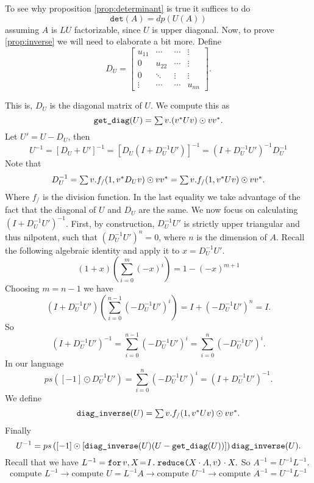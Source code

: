 To see why proposition \ref{prop:determinant} is true it suffices to do $$\texttt{det}(A)=dp(U(A))$$ assuming $A$ is $LU$ factorizable, since $U$ is upper diagonal.
Now, to prove \ref{prop:inverse} we will need to elaborate a bit more. Define 
\[
D_U = \begin{bmatrix}
    u_{11} & \cdots & \cdots &  \vdots \\
    0 & u_{22} & \cdots &  \vdots \\
    0 & \ddots & \vdots & \vdots \\
    \vdots & \cdots& \cdots & u_{nn}
\end{bmatrix}.
\]

This is, $D_U$ is the diagonal matrix of $U$. We compute this as $$ \getdiag{U} = \ssum v. (v^*Uv) \odot vv^*.$$
Let $U'=U-D_U$, then $$ U^{-1}=\left[ D_U+U' \right]^{-1}= \left[ D_U\left( I+D_U^{-1}U'\right) \right]^{-1} = \left( I+D_U^{-1}U'\right)^{-1}D_U^{-1} $$
Note that $$D_U^{-1}=\ssum v. f_{/}(1,v^*D_Uv)\odot vv^*=\ssum v. f_{/}(1,v^*Uv)\odot vv^*.$$
Where $f_{/}$ is the division function. In the last equality we take advantage of the fact that the diagonal of $U$ and $D_U$ are the same.
We now focus on calculating $\left( I+D_U^{-1}U'\right)^{-1}$. First, by construction, $D_U^{-1}U'$ is strictly upper triangular and thus nilpotent, such that $\left( D_U^{-1}U'\right)^n=0$, where $n$ is the dimension of $A$. Recall the following algebraic identity and apply it to $x=D_U^{-1}U'$. $$(1+x)\left( \sum_{i=0}^{m}(-x)^i \right)=1-(-x)^{m+1}$$
Choosing $m=n-1$ we have $$\left(I+D_U^{-1}U' \right)\left( \sum_{i=0}^{n-1}(-D_U^{-1}U')^i \right)=I+ \left( -D_U^{-1}U'\right)^n =I. $$
So $$\left(I+D_U^{-1}U' \right)^{-1}=\sum_{i=0}^{n-1}(-D_U^{-1}U')^i=\sum_{i=0}^{n}(-D_U^{-1}U')^i.$$
In our language $$ps([-1]\odot D_U^{-1}U')=\sum_{i=0}^{n}(-D_U^{-1}U')^i=\left(I+D_U^{-1}U' \right)^{-1}.$$
We define $$\diaginverse{U}=\ssum v. f_{/}(1,v^*Uv)\odot vv^*.$$
Finally $$U^{-1}= ps\left([-1]\odot \left[\diaginverse{U}(U-\getdiag{U})\right] \right)\diaginverse{U}.$$
Recall that we have $L^{-1}=\initf{I}{v}{X}{\red{X\cdot A}{v}\cdot X}.$ So $A^{-1}=U^{-1}L^{-1}.$
$$\text{compute }L^{-1}\rightarrow\text{compute }U=L^{-1}A\rightarrow\text{compute }U^{-1}\rightarrow\text{compute }A^{-1}=U^{-1}L^{-1}$$